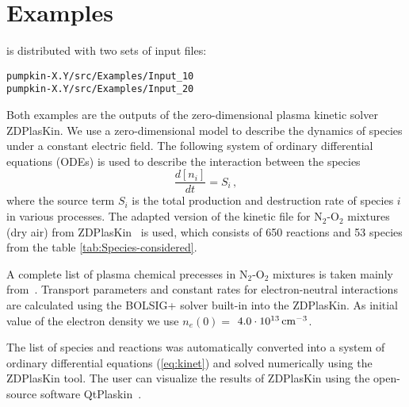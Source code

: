 
\chapter{Examples}
\label{chap_4}

\pump{} is distributed with two sets of input files:
\begin{display}
\begin{verbatim}
pumpkin-X.Y/src/Examples/Input_10
pumpkin-X.Y/src/Examples/Input_20
\end{verbatim}
\end{display}

Both examples are the outputs of the zero-dimensional plasma kinetic solver ZDPlasKin. We use a zero-dimensional model to describe the dynamics of species under a constant electric field. The following system of ordinary differential equations (ODEs) is used to describe the interaction between the species
\begin{equation}
\label{eq:kinet}
\frac{d[n_i]}{dt}=S_i\,,
\end{equation}
where the source term $S_i$  is the total production and destruction rate of species $i$ in various processes. 
The adapted version of the kinetic file for N$_2$-O$_2$ mixtures (dry air) from ZDPlasKin~\cite{Sergey2008,Flitti2009} is used, which consists of 650 reactions and 53 species from the table \ref{tab:Species-considered}. 

A complete list of plasma chemical precesses in N$_2$-O$_2$ mixtures is taken mainly from~\cite{Capitelli2000/book}. Transport parameters and constant rates for electron-neutral interactions are calculated using 
the BOLSIG+ solver built-in into the ZDPlasKin. As initial value of the electron density we use $n_e(0) = $ $4.0\cdot 10^{13}\,\mathrm{cm^{-3}}$. 

The list of species and reactions was automatically converted into a system of ordinary differential equations (\ref{eq:kinet}) and solved numerically using the ZDPlasKin tool. The user can visualize the results of ZDPlasKin using the open-source software QtPlaskin~\cite{Qtplaskin}.

